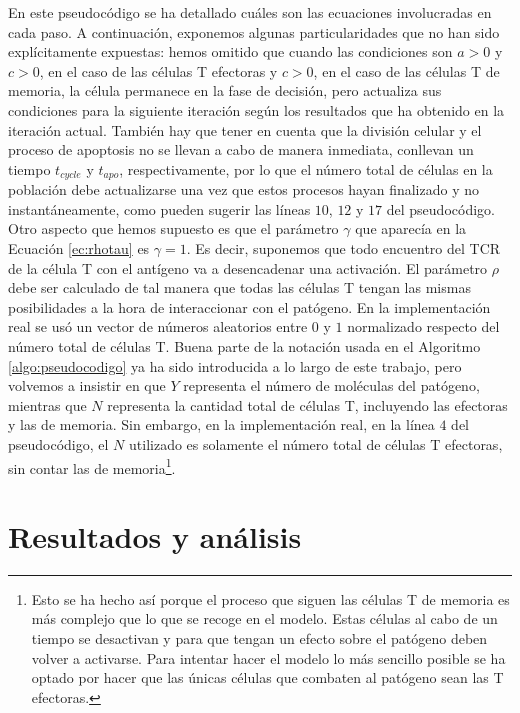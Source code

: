 En este pseudocódigo se ha detallado cuáles son las ecuaciones involucradas en cada paso. A continuación, exponemos algunas particularidades que no han sido explícitamente expuestas: hemos omitido que cuando las condiciones son $a > 0$ y $c > 0$, en el caso de las células T efectoras y $c > 0$, en el caso de las células T de memoria, la célula permanece en la fase de decisión, pero actualiza sus condiciones para la siguiente iteración según los resultados que ha obtenido en la iteración actual. También hay que tener en cuenta que la división celular y el proceso de apoptosis no se llevan a cabo de manera inmediata, conllevan un tiempo $t_{cycle}$ y $t_{apo}$, respectivamente, por lo que el número total de células en la población debe actualizarse una vez que estos procesos hayan finalizado y no instantáneamente, como pueden sugerir las líneas $10$, $12$ y $17$ del pseudocódigo. Otro aspecto que hemos supuesto es que el parámetro $\gamma$ que aparecía en la Ecuación \ref{ec:rhotau} es $\gamma = 1$. Es decir, suponemos que todo encuentro del TCR de la célula T con el antígeno va a desencadenar una activación. El parámetro $\rho$ debe ser calculado de tal manera que todas las células T tengan las mismas posibilidades a la hora de interaccionar con el patógeno. En la implementación real se usó un vector de números aleatorios entre $0$ y $1$ normalizado respecto del número total de células T. Buena parte de la notación usada en el Algoritmo \ref{algo:pseudocodigo} ya ha sido introducida a lo largo de este trabajo, pero volvemos a insistir en que $Y$ representa el número de moléculas del patógeno, mientras que $N$ representa la cantidad total de células T, incluyendo las efectoras y las de memoria. Sin embargo, en la implementación real, en la línea $4$ del pseudocódigo, el $N$ utilizado es solamente el número total de células T efectoras, sin contar las de memoria\footnote{Esto se ha hecho así porque el proceso que siguen las células T de memoria es más complejo que lo que se recoge en el modelo. Estas células al cabo de un tiempo se desactivan y para que tengan un efecto sobre el patógeno deben volver a activarse. Para intentar hacer el modelo lo más sencillo posible se ha optado por hacer que las únicas células que combaten al patógeno sean las T efectoras.}.


\section{Resultados y análisis}
\label{sec:simulacionesMicro}

